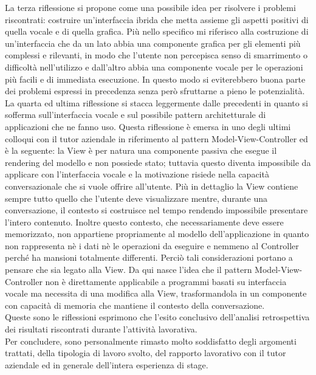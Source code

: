 La terza riflessione si propone come una possibile idea per risolvere i problemi riscontrati: costruire un'interfaccia ibrida che metta assieme gli aspetti positivi di quella vocale e di quella grafica. Più nello specifico mi riferisco alla costruzione di un'interfaccia che da un lato abbia una componente grafica per gli elementi più complessi e rilevanti, in modo che l'utente non percepisca senso di smarrimento o difficoltà nell'utilizzo e dall'altro abbia una componente vocale per le operazioni più facili e di immediata esecuzione. In questo modo si eviterebbero buona parte dei problemi espressi in precedenza senza però sfruttarne a pieno le potenzialità. \\
La quarta ed ultima riflessione si stacca leggermente dalle precedenti in quanto si sofferma sull'interfaccia vocale e sul possibile pattern architetturale di applicazioni che ne fanno uso. Questa riflessione è emersa in uno degli ultimi colloqui con il tutor aziendale in riferimento al pattern Model-View-Controller ed è la seguente: la View è per natura una componente passiva che esegue il rendering del modello e non possiede stato; tuttavia questo diventa impossibile da applicare con l'interfaccia vocale e la motivazione risiede nella capacità conversazionale che si vuole offrire all'utente. Più in dettaglio la View contiene sempre tutto quello che l'utente deve visualizzare mentre, durante una conversazione, il contesto si costruisce nel tempo rendendo impossibile presentare l'intero contenuto. Inoltre questo contesto, che necessariamente deve essere memorizzato, non appartiene propriamente al modello dell'applicazione in quanto non rappresenta nè i dati nè le operazioni da eseguire e nemmeno al Controller perché ha mansioni totalmente differenti. Perciò tali considerazioni portano a pensare che sia legato alla View. Da qui nasce l'idea che il pattern Model-View-Controller non è direttamente applicabile a programmi basati su interfaccia vocale ma necessita di una modifica alla View, trasformandola in un componente con capacità di memoria che mantiene il contesto della conversazione. \\
Queste sono le riflessioni esprimono che l'esito conclusivo dell'analisi retrospettiva dei risultati riscontrati durante l'attività lavorativa. \\
Per concludere, sono personalmente rimasto molto soddisfatto degli argomenti trattati, della tipologia di lavoro svolto, del rapporto lavorativo con il tutor aziendale ed in generale dell'intera esperienza di stage.
